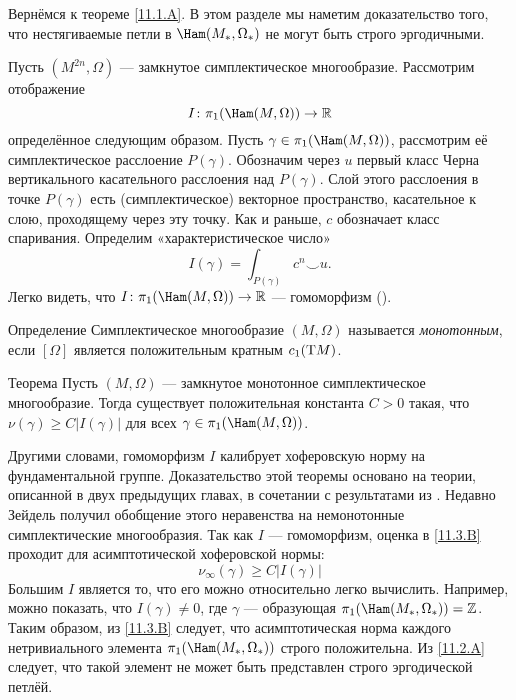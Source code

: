 Вернёмся к теореме \ref{11.1.A}.
В этом разделе мы наметим доказательство того, что нестягиваемые петли
в $\Ham(M_\ast, \Omega_\ast)$ не могут быть строго эргодичными.

Пусть $(M^{2n},\Omega)$ --- замкнутое симплектическое многообразие.
Рассмотрим отображение
\[I\:\pi_1(\Ham(M,\Omega))\to\RR\]
определённое следующим образом.
Пусть $\gamma\in\pi_1(\Ham(M,\Omega))$,
рассмотрим её симплектическое расслоение $P(\gamma)$.
Обозначим через $u$ первый класс Черна вертикального касательного
расслоения над $P(\gamma)$.
Слой этого расслоения в точке $P(\gamma)$ есть (симплектическое)
векторное пространство, касательное к слою, проходящему через эту
точку. 
Как и раньше, $c$ обозначает класс спаривания.
Определим «характеристическое число» 
\[I(\gamma)= \int_{P(\gamma)} c^n\smallsmile u.\]
Легко видеть, что $I\: \pi_1(\Ham(M, \Omega))\to \RR$ --- гомоморфизм
(\cite{P6,LMP2}). 

\begin{ex}{Определение}\label{11.3.A} Симплектическое многообразие
  $(M,\Omega)$ называется \emph{монотонным}, если $[\Omega]$ является
  положительным кратным $c_1 (\mathrm{T} M)$.
\end{ex}

\begin{thm}[(\cite{P6})]{Теорема}\label{11.3.B}
Пусть $(M, \Omega)$ --- замкнутое монотонное симплектическое многообразие.
Тогда существует положительная константа $C>0$ такая, что
$\nu(\gamma)\ge C|I(\gamma)|$ для всех $\gamma\z\in\pi_1(\Ham(M,\Omega))$.
\end{thm}

Другими словами, гомоморфизм $I$ калибрует хоферовскую норму на
фундаментальной группе.
Доказательство этой теоремы основано на теории, описанной в двух
предыдущих главах, в сочетании с результатами из \cite{Se}.
Недавно Зейдель получил обобщение этого неравенства на немонотонные
симплектические многообразия.
Так как $I$ --- гомоморфизм, оценка в \ref{11.3.B} проходит для
асимптотической хоферовской нормы:
\[\nu_\infty(\gamma)\ge C|I(\gamma)|\]
Большим  $I$ является то,
что его можно относительно легко вычислить.
Например, можно показать, что $I(\gamma) \ne 0$, где $\gamma$ ---
образующая $\pi_1(\Ham(M_\ast,\Omega_\ast)) = \ZZ$.
Таким образом, из \ref{11.3.B} следует, что асимптотическая норма
каждого нетривиального элемента $\pi_1(\Ham(M_\ast, \Omega_\ast))$
строго положительна.
Из \ref{11.2.A} следует, что такой элемент не может быть представлен
строго эргодической петлёй.
